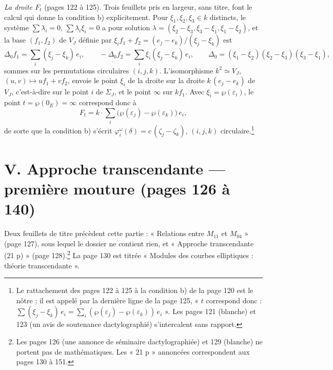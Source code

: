 \documentclass[11pt,a4paper]{article}
\begin{document}
\emph{La droite $F_t$} (pages 122 à 125). Trois feuillets pris en largeur, sans
titre, font le calcul qui donne la condition b) explicitement. Pour $\xi_1, \xi_2,
\xi_3 \in k$ distincts, le système $\sum \lambda_i = 0$, $\sum \lambda_i \xi_i =
0$ a pour solution $\lambda = (\xi_2 - \xi_3, \xi_3 - \xi_1, \xi_1 - \xi_2)$, et la
base $(f_1, f_2)$ de $V_J$ définie par $\xi_i f_1 + f_2 = (e_j - e_k)/(\xi_j -
\xi_k)$ est
\[
\Delta_0 f_1 = \sum_{i} (\xi_j - \xi_k)\, e_i, \qquad -\Delta_0 f_2 = \sum_i
\xi_i (\xi_j - \xi_k)\, e_i, \qquad \Delta_0 = (\xi_1 - \xi_2)(\xi_2 -
\xi_3)(\xi_3 - \xi_1),
\]
sommes sur les permutations circulaires $(i, j, k)$. L'isomorphisme $k^2 \simeq
V_J$, $(u, v) \mapsto u f_1 + v f_2$, envoie le point $\xi_i$ de la droite sur
la droite $k\,(e_j - e_k)$ de $V_J$, c'est-à-dire sur le point $i$ de
$\Sigma_J$, et le point $\infty$ sur $k f_1$. Avec $\xi_i = \wp(\varepsilon_i)$,
le point $t = \wp(0_E) = \infty$ correspond donc à
\[
F_t = k \cdot \sum_i \bigl(\wp(\varepsilon_j) - \wp(\varepsilon_k)\bigr)\, e_i ,
\]
de sorte que la condition b) s'écrit $\varphi_i^{\omega}(\delta) = c\,(\zeta_j -
\zeta_k)$, $(i, j, k)$ circulaire.\footnote{Le rattachement des pages 122 à 125
à la condition b) de la page 120 est le nôtre ; il est appelé par la dernière
ligne de la page 125, « $t$ correspond donc : $\sum (\xi_j - \xi_k)\, e_i =
\sum_i (\wp(\varepsilon_j) - \wp(\varepsilon_k))\, e_i$ ». Les pages 121
(blanche) et 123 (un avis de soutenance dactylographié) s'intercalent sans
rapport.}

\section*{V. Approche transcendante --- première mouture (pages 126 à 140)}

Deux feuillets de titre précèdent cette partie : « Relations entre $M_{11}$ et
$M_{04}$ » (page 127), sous lequel le dossier ne contient rien, et « Approche
transcendante (21 p) » (page 128).\footnote{Les pages 126 (une annonce de
séminaire dactylographiée) et 129 (blanche) ne portent pas de mathématiques. Les
« 21 p » annoncées correspondent aux pages 130 à 151.} La page 130 est titrée
« Modules des courbes elliptiques : théorie transcendante ».
\end{document}
